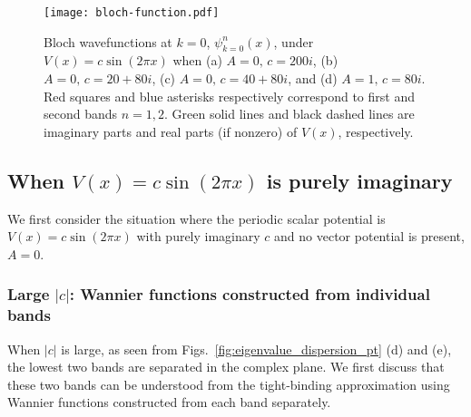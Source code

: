 \documentclass[prb,superscriptaddress,floatfix,twocolumn,showpacs]{revtex4-2}
\begin{document}
\begin{figure}[tbp]
    \centering
    \texttt{[image: bloch-function.pdf]}
    \caption{Bloch wavefunctions at $k=0$, $\psi_{k=0}^n (x)$, under  $V(x) = c \sin (2\pi x)$ when (a) $A=0,\,c=200i$, (b) $A=0,\,c=20+80i$, (c) $A=0,\,c=40+80i$, and (d) $A=1,\,c=80i$. 
    Red squares and blue asterisks respectively correspond to first and second bands $n=1,2$. 
    Green solid lines and black dashed lines are imaginary parts and real parts (if nonzero) of $V(x)$, respectively.}
    \label{fig:bloch-function}
\end{figure}

\subsection{When $V(x) = c \sin (2\pi x)$ is purely imaginary}
\label{subsec:imaginary-potential_without-A}

We first consider the situation where the periodic scalar potential is $V(x) = c\sin (2\pi x)$ with purely imaginary $c$ and no vector potential is present, $A = 0$. 

\subsubsection{Large $|c|$: Wannier functions constructed from individual bands}
\label{subsubsec:large-c}
When $|c|$ is large, as seen from Figs.~\ref{fig:eigenvalue_dispersion_pt} (d) and (e), the lowest two bands are separated in the complex plane. We first discuss that these two bands can be understood from the tight-binding approximation using Wannier functions constructed from each band separately.
\end{document}
